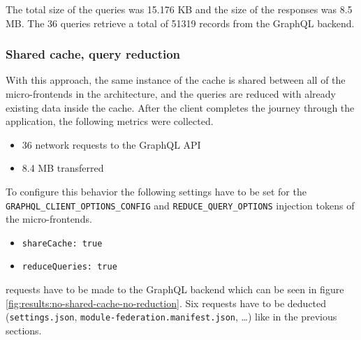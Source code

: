 \noindent The total size of the queries was 15.176 KB and the size of the responses was 8.5 MB. The 36 queries retrieve a total of 51319 records from the GraphQL backend.

\subsubsection{Shared cache, query reduction}\label{subsubsection:results:performance-measurement:separate-cache-reduction}

With this approach, the same instance of the cache is shared between all of the micro-frontends in the architecture, and the queries are reduced with already existing data inside the cache. After the client completes the journey through the application, the following metrics were collected.

\begin{itemize}
  \item 36 network requests to the GraphQL \ac{API}
  \item 8.4 MB transferred
\end{itemize}

\noindent To configure this behavior the following settings have to be set for the \texttt{GRAPHQL\_CLIENT\_OPTIONS\_CONFIG} and \texttt{REDUCE\_QUERY\_OPTIONS} injection tokens of the micro-frontends.

\begin{itemize}
  \item \texttt{shareCache: true}
  \item \texttt{reduceQueries: true}
\end{itemize}

 requests have to be made to the GraphQL backend which can be seen in figure \ref{fig:results:no-shared-cache-no-reduction}. Six requests have to be deducted (\texttt{settings.json}, \texttt{module-federation.manifest.json}, \dots) like in the previous sections.

